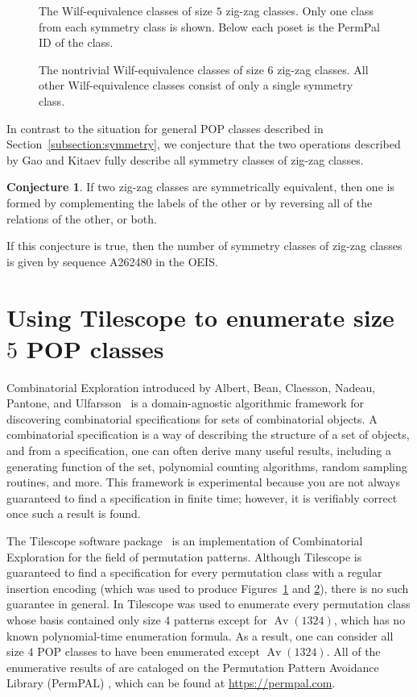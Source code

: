 \documentclass[11pt]{article}
\theoremstyle{definition}
\newtheorem{conjecture}[theorem]{Conjecture}
\numberwithin{theorem}{section}
\numberwithin{question}{section}
\numberwithin{definition}{section}
\numberwithin{example}{section}
\numberwithin{remark}{section}
\newcommand{\Av}{\operatorname{Av}}
\begin{document}
\begin{figure}\centering
	
	\caption{The Wilf-equivalence classes of size $5$ zig-zag classes. Only one class from each symmetry class is shown. Below each poset is the PermPal ID of the class.}
	\label{fig:M-classes}
\end{figure}

\begin{figure}
	
	\caption{The nontrivial Wilf-equivalence classes of size $6$ zig-zag classes. All other Wilf-equivalence classes consist of only a single symmetry class.}
	\label{fig:zz6}
\end{figure}


In contrast to the situation for general POP classes described in Section~\ref{subsection:symmetry}, we conjecture that the two operations described by Gao and Kitaev fully describe all symmetry classes of zig-zag classes.
\begin{conjecture}
	If two zig-zag classes are symmetrically equivalent, then one is formed by  complementing the labels of the other or by reversing all of the relations of the other, or both.
\end{conjecture}
If this conjecture is true, then the number of symmetry classes of zig-zag classes is given by sequence A262480 in the OEIS.

\section{Using Tilescope to enumerate size $5$ POP classes}
\label{section:tilescope}

Combinatorial Exploration introduced by Albert, Bean, Claesson, Nadeau, Pantone, and Ulfarsson~\cite{combinatorial-exploration} is a domain-agnostic algorithmic framework for discovering combinatorial specifications for sets of combinatorial objects. A combinatorial specification is a way of describing the structure of a set of objects, and from a specification, one can often derive many useful results, including a generating function of the set, polynomial counting algorithms, random sampling routines, and more. This framework is experimental because you are not always guaranteed to find a specification in finite time; however, it is verifiably correct once such a result is found.

The Tilescope software package~\cite{tilings-bibtex} is an implementation of Combinatorial Exploration for the field of permutation patterns. Although Tilescope is guaranteed to find a specification for every permutation class with a regular insertion encoding (which was used to produce Figures~\ref{fig:M-classes} and \ref{fig:zz6}), there is no such guarantee in general. In \cite{combinatorial-exploration} Tilescope was used to enumerate every permutation class whose basis contained only size $4$ patterns except for $\Av(1324)$, which has no known polynomial-time enumeration formula. As a result, one can consider all size $4$ POP classes to have been enumerated except $\Av(1324)$. All of the enumerative results of \cite{combinatorial-exploration} are cataloged on the Permutation Pattern Avoidance Library (PermPAL) \cite{permpal-bibtex}, which can be found at \url{https://permpal.com}.
\end{document}
